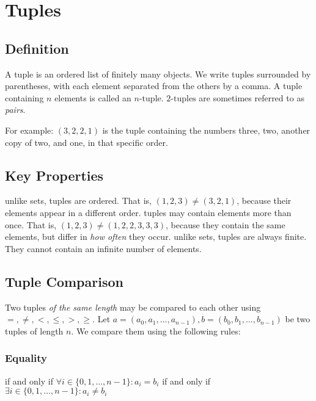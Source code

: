 \chapter{Tuples}\label{ch:tuples}
\section{Definition}
\begin{definition}
  A tuple is an ordered list of finitely many objects.
  We write tuples surrounded by parentheses, with each element
  separated from the others by a comma.
  A tuple containing \(n\) elements is called an \(n\text{-tuple}\).
  \(2\text{-tuples}\) are sometimes referred to as \emph{pairs}.
\end{definition}
\begin{example}
  [A tuple]
  For example: \((3, 2, 2, 1)\) is the tuple
  containing the numbers three, two, another copy of two,
  and one, in that specific order.
\end{example}

\section{Key Properties}
\begin{itemize}
   unlike sets, tuples are ordered. That is,
      \((1,2,3)\neq (3,2,1)\),
  because their elements appear in a different order.
   tuples may contain elements more than once.
  That is, \((1,2,3) \neq (1,2,2,3,3,3)\), because they contain the same
  elements, but differ in \emph{how often} they occur.
   unlike sets, tuples are always finite.
  They cannot contain an infinite number of elements.
\end{itemize}

\section{Tuple Comparison}
Two tuples \emph{of the same length} may be compared to each other using
\(=, \neq, <, \leq, >, \geq\).
Let \(a = (a_{0}, a_{1}, \dots, a_{n-1}), b = (b_{0}, b_{1}, \dots, b_{n-1})\) be
two tuples of length \(n\). We compare them using the following rules:

\subsection*{Equality}
\begin{itemize}
   if and only if \(\forall i \in \{0, 1, \dots, n-1\}: a_{i} = b_{i}\)
   if and only if \(\exists i \in \{0, 1, \dots, n-1\}: a_{i} \neq b_{i}\)
\end{itemize}

